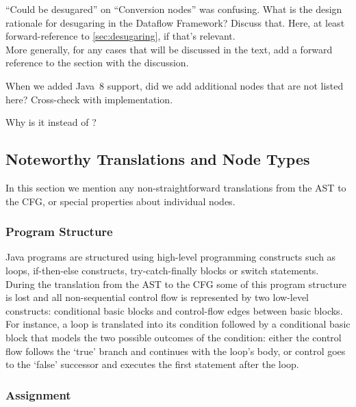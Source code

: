 \begin{workinprogress}
``Could be desugared'' on ``Conversion
nodes'' was confusing.  What is the design rationale for
desugaring in the Dataflow Framework?   Discuss that.  Here, at least
forward-reference to \autoref{sec:desugaring}, if that's relevant. \\
More generally, for any cases that will be discussed in the text, add a
forward reference to the section with the discussion.
\end{workinprogress}

\begin{workinprogress}
When we added Java~8 support, did we add additional nodes that are not
listed here? Cross-check with implementation.
\end{workinprogress}

\begin{workinprogress}
Why is it  instead of ?
\end{workinprogress}


\subsection{Noteworthy Translations and Node Types}
\label{sec:noteworthy-translations}

In this section we mention any non-straightforward translations from the AST to
the CFG, or special properties about individual nodes.


\subsubsection{Program Structure}
\label{sec:prog-structure}

Java programs are structured using high-level programming constructs
such as loops, if-then-else constructs,
try-catch-finally blocks or switch statements.  During the translation
from the AST to the CFG some of this program structure is lost and all
non-sequential control flow is represented by two low-level
constructs: conditional basic blocks and control-flow edges between
basic blocks. For instance, a  loop is translated into its
condition followed by a conditional basic block that models the two
possible outcomes of the condition: either the control flow follows
the `true' branch and continues with the loop's body, or control goes to the
`false' successor and executes the first statement after the loop.


\subsubsection{Assignment}

